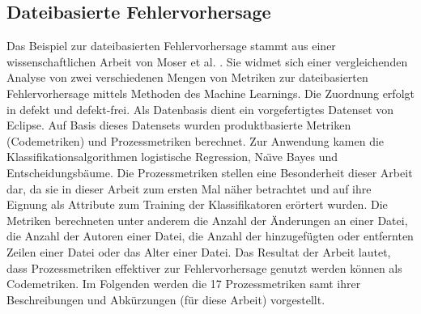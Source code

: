 \subsection*{Dateibasierte Fehlervorhersage}
\label{moser}

Das Beispiel zur dateibasierten Fehlervorhersage stammt aus einer wissenschaftlichen Arbeit von Moser et al. \cite{Moser2008}. Sie widmet sich einer vergleichenden Analyse von zwei verschiedenen Mengen von Metriken zur dateibasierten Fehlervorhersage mittels Methoden des Machine Learnings. Die Zuordnung erfolgt in \glqq defekt\grqq{} und \glqq defekt-frei\grqq. Als Datenbasis dient ein vorgefertigtes Datenset von Eclipse. Auf Basis dieses Datensets wurden \glqq produktbasierte\grqq{} Metriken (Codemetriken) und Prozessmetriken berechnet. Zur Anwendung kamen die Klassifikationsalgorithmen logistische Regression, Na\"{\i}ve Bayes und Entscheidungsbäume. Die Prozessmetriken stellen eine Besonderheit dieser Arbeit dar, da sie in dieser Arbeit zum ersten Mal näher betrachtet und auf ihre Eignung als Attribute zum Training der Klassifikatoren erörtert wurden. Die Metriken berechneten unter anderem die Anzahl der Änderungen an einer Datei, die Anzahl der Autoren einer Datei, die Anzahl der hinzugefügten oder entfernten Zeilen einer Datei oder das Alter einer Datei. Das Resultat der Arbeit lautet, dass Prozessmetriken effektiver zur Fehlervorhersage genutzt werden können als Codemetriken. Im Folgenden werden die 17 Prozessmetriken samt ihrer Beschreibungen und Abkürzungen (für diese Arbeit) vorgestellt.

